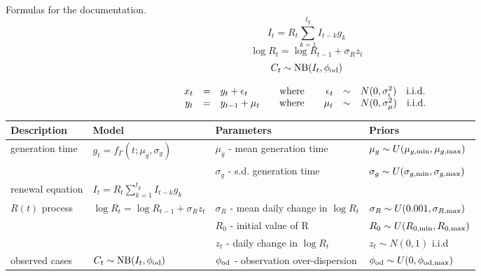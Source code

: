 \documentclass[11pt, oneside]{amsart}   	%
\begin{document}
Formulas for the documentation.
\begin{equation}
I_t = R_t \sum_{k=1}^{t_g} I_{t-k} g_k
\end{equation}
\begin{equation}
\log R_t = \log R_{t-1} + \sigma_R z_t
\end{equation}
\begin{equation}
C_t \sim {\rm NB}(I_t,\phi_{\rm od})
\end{equation}

\begin{equation}
\begin{array}{rclcrcl}
x_t &=& y_t + \epsilon_t &\quad {\rm where } \quad& \epsilon_t &\sim& N(0,\sigma^2_\epsilon) \quad {\rm{i.i.d.\ }} \\
y_t &=& y_{t-1} + \mu_t &\quad {\rm where } \quad& \mu_t &\sim& N(0,\sigma^2_\mu) \quad {\rm{i.i.d.\ }}
\end{array}
\end{equation}

\begin{table}[]
\begin{tabular}{l|l|l|l}
{\bf Description } & {\bf Model }&  {\bf Parameters } & {\bf  Priors  }  \\ \hline
generation time & $g_t = f_{\Gamma}(t; \mu_g,\sigma_g)$ & $\mu_g$ - mean generation time  &  $\mu_g \sim U(\mu_{g,\rm min}, \mu_{g,\rm max}) $\\
&  & $\sigma_g$ - s.d. generation time  & $\sigma_g \sim U(\sigma_{g,\rm min}, \sigma_{g,\rm max}) $ \\ \hline
renewal equation & $I_t = R_t \sum\limits_{k=1}^{t_g} I_{t-k} g_k$  & & \\ \hline
$R(t)$ process & $\log R_t = \log R_{t-1} + \sigma_R z_t$ & $\sigma_R$ - mean daily change in $\log R_t $& $\sigma_R \sim U(0.001,\sigma_{R,\rm max})$ \\
& & $R_0$ - initial value of R & $R_0 \sim U(R_{0,\rm min}, R_{0,\rm max})$ \\
& & $z_t$ - daily change in $\log R_t $ & $z_t \sim N(0,1)$ i.i.d \\ \hline
observed cases & $C_t \sim {\rm NB}(I_t,\phi_{\rm od})$ & $\phi_{\rm od}$ - observation over-dispersion & $\phi_{\rm od} \sim U(0,\phi_{\rm od,max})$
\end{tabular}
\end{table}
\end{document}
